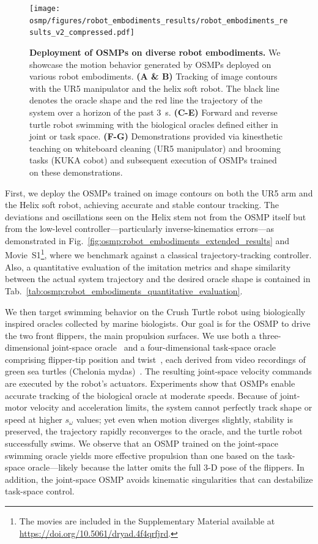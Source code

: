 \begin{figure}
    \centering
    \texttt{[image: osmp/figures/robot\_embodiments\_results/robot\_embodiments\_results\_v2\_compressed.pdf]}
    \caption{\textbf{Deployment of \glspl{OSMP} on diverse robot embodiments.}
    We showcase the motion behavior generated by \glspl{OSMP} deployed on various robot embodiments.
    \textbf{(A \& B)} Tracking of image contours with the UR5 manipulator and the helix soft robot. The black line denotes the oracle shape and the red line the trajectory of the system over a horizon of the past $3$~s.
    \textbf{(C-E)} Forward and reverse turtle robot swimming with the biological oracles defined either in joint or task space.
    \textbf{(F-G)} Demonstrations provided via kinesthetic teaching on whiteboard cleaning (UR5 manipulator) and brooming tasks (KUKA cobot) and subsequent execution of \glspl{OSMP} trained on these demonstrations.
    }
    \label{fig:osmp:robot_embodiments_results}
\end{figure}

First, we deploy the \glspl{OSMP} trained on image contours on both the UR5 arm and the Helix soft robot, achieving accurate and stable contour tracking. The deviations and oscillations seen on the Helix stem not from the \gls{OSMP} itself but from the low-level controller—particularly inverse-kinematics errors—as demonstrated in Fig.~\ref{fig:osmp:robot_embodiments_extended_results} and Movie~S1\footnote{The movies are included in the Supplementary Material available at \url{https://doi.org/10.5061/dryad.4f4qrfjrd}.}, where we benchmark against a classical trajectory-tracking controller.
Also, a quantitative evaluation of the imitation metrics and shape similarity between the actual system trajectory and the desired oracle shape is contained in Tab.~\ref{tab:osmp:robot_embodiments_quantitative_evaluation}.

We then target swimming behavior on the Crush Turtle robot using biologically inspired oracles collected by marine biologists. Our goal is for the \gls{OSMP} to drive the two front flippers, the main propulsion surfaces. We use both a three-dimensional joint-space oracle~\citep{van2023soft} and a four-dimensional task-space oracle comprising flipper-tip position and twist~\citep{van2022new}, each derived from video recordings of green sea turtles (Chelonia mydas)~\citep{van2022new,van2023soft}. The resulting joint-space velocity commands are executed by the robot’s actuators. Experiments show that \glspl{OSMP} enable accurate tracking of the biological oracle at moderate speeds. Because of joint-motor velocity and acceleration limits, the system cannot perfectly track shape or speed at higher $s_\omega$ values; yet even when motion diverges slightly, stability is preserved, the trajectory rapidly reconverges to the oracle, and the turtle robot successfully swims. 
We observe that an \gls{OSMP} trained on the joint-space swimming oracle yields more effective propulsion than one based on the task-space oracle—likely because the latter omits the full 3-D pose of the flippers. In addition, the joint-space \gls{OSMP} avoids kinematic singularities that can destabilize task-space control.

